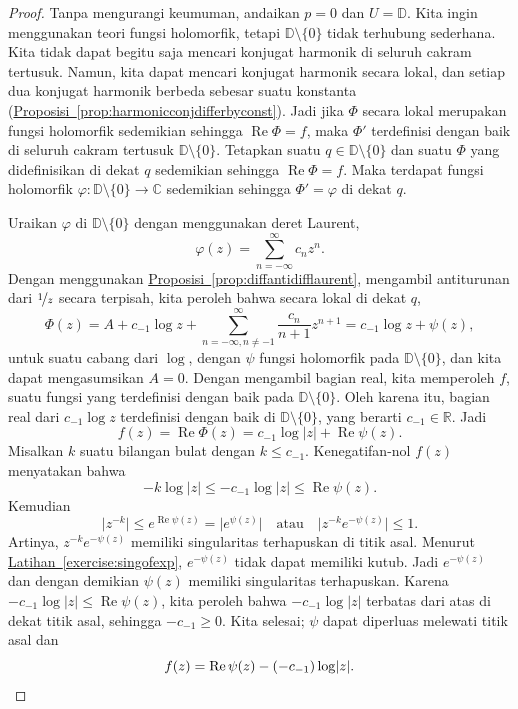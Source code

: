 \documentclass[12pt,openany]{book}
\renewcommand{\Re}{\operatorname{Re}}
\newcommand{\sabs}[1]{\lvert {#1} \rvert}
\newcommand{\babs}[1]{\bigl\lvert {#1} \bigr\rvert}
\newcommand{\C}{{\mathbb{C}}}
\newcommand{\R}{{\mathbb{R}}}
\newcommand{\D}{{\mathbb{D}}}
\theoremstyle{plain}
\theoremstyle{remark}
\theoremstyle{definition}
\theoremstyle{exercise}
\theoremstyle{example}
\newcommand{\exerciseref}[1]{\hyperref[#1]{Latihan~\ref*{#1}}}
\newcommand{\propref}[1]{\hyperref[#1]{Proposisi~\ref*{#1}}}
\begin{document}
\begin{proof}
Tanpa mengurangi keumuman, andaikan $p=0$ dan $U = \D$.
Kita ingin menggunakan teori fungsi holomorfik,
tetapi $\D \setminus \{ 0 \}$ tidak terhubung sederhana.  Kita tidak dapat begitu saja mencari
konjugat harmonik di seluruh cakram tertusuk.  Namun, kita dapat mencari konjugat harmonik
secara lokal, dan setiap dua konjugat harmonik berbeda sebesar suatu
konstanta (\propref{prop:harmonicconjdifferbyconst}).
Jadi jika $\Phi$ secara lokal merupakan fungsi holomorfik
sedemikian sehingga $\Re \Phi = f$, maka $\Phi'$ terdefinisi dengan baik di seluruh
cakram tertusuk $\D \setminus \{ 0 \}$.  Tetapkan suatu $q \in \D \setminus \{ 0 \}$
dan suatu $\Phi$ yang didefinisikan di dekat $q$ sedemikian sehingga $\Re \Phi = f$.
Maka terdapat fungsi holomorfik $\varphi \colon
\D \setminus \{ 0 \} \to \C$ sedemikian sehingga $\Phi' = \varphi$ di dekat $q$.

Uraikan $\varphi$ di $\D \setminus \{ 0 \}$ dengan menggunakan deret Laurent,
\begin{equation*}
\varphi(z) = \sum_{n=-\infty}^\infty c_n {z}^n .
\end{equation*}
Dengan menggunakan \propref{prop:diffantidifflaurent},
mengambil antiturunan dari $\nicefrac{1}{z}$ secara terpisah,
kita peroleh bahwa secara lokal di dekat $q$,
\begin{equation*}
\Phi(z) =
A+
c_{-1} \log z +  
\sum_{n=-\infty,n \neq -1}^\infty \frac{c_n}{n+1} {z}^{n+1}
=
c_{-1} \log z +  
\psi(z),
\end{equation*}
untuk suatu cabang dari $\log$, dengan $\psi$ fungsi holomorfik
pada $\D \setminus \{ 0 \}$,
dan kita dapat mengasumsikan $A=0$.
Dengan mengambil bagian real, kita memperoleh $f$, suatu fungsi yang terdefinisi dengan baik pada
$\D \setminus \{ 0 \}$.  Oleh karena itu,
bagian real dari $c_{-1} \log z$ terdefinisi dengan baik di $\D \setminus \{ 0 \}$,
yang berarti $c_{-1} \in \R$.
Jadi
\begin{equation*}
f(z) = \Re \Phi(z) =
c_{-1} \log \sabs{z} +  
\Re \psi(z).
\end{equation*}
Misalkan $k$ suatu bilangan bulat dengan $k \leq c_{-1}$.
Kenegatifan-nol $f(z)$ menyatakan bahwa
\begin{equation*}
-k \log \sabs{z} \leq
-c_{-1} \log \sabs{z} \leq  \Re \psi(z) .
\end{equation*}
Kemudian
\begin{equation*}
\sabs{z^{-k}} \leq e^{\Re \psi(z)} = \babs{e^{\psi(z)}} 
\quad
\text{atau}
\quad
\sabs{z^{-k} e^{-\psi(z)}} \leq 1 .
\end{equation*}
Artinya, 
$z^{-k} e^{-\psi(z)}$ memiliki
singularitas terhapuskan di titik asal.
Menurut \exerciseref{exercise:singofexp}, 
$e^{-\psi(z)}$ tidak dapat memiliki kutub.
Jadi $e^{-\psi(z)}$
dan dengan demikian $\psi(z)$ memiliki singularitas terhapuskan.
Karena $-c_{-1} \log\sabs{z} \leq \Re \psi(z)$,
kita peroleh bahwa $-c_{-1} \log\sabs{z}$ terbatas dari atas
di dekat titik asal, sehingga $-c_{-1} \geq 0$.
Kita selesai; $\psi$ dapat diperluas melewati titik asal
dan
\begin{equation*}
f(z) = \Re \psi(z) - (-c_{-1}) \log \sabs{z} . \qedhere
\end{equation*}
\end{proof}
\end{document}
